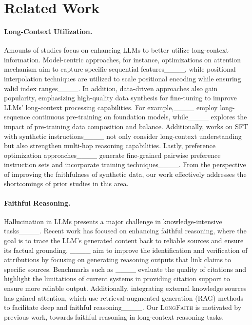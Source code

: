 \section{Related Work}
\label{sec:related}

\paragraph{Long-Context Utilization.} Amounts of studies focus on enhancing LLMs to better utilize long-context information. Model-centric approaches, for instance, optimizations on attention mechanism aim to capture specific sequential features____, while positional interpolation techniques are utilized to scale positional encoding while ensuring valid index ranges____. In addition, data-driven approaches also gain popularity, emphasizing high-quality data synthesis for fine-tuning to improve LLMs' long-context processing capabilities. For example,____ employ long-sequence continuous pre-training on foundation models, while____ explores the impact of pre-training data composition and balance. Additionally, works on SFT with synthetic instructions____ not only consider long-context understanding but also strengthen multi-hop reasoning capabilities. Lastly, preference optimization approaches____ generate fine-grained pairwise preference instruction sets and incorporate training techniques____. From the perspective of improving the faithfulness of synthetic data, our work effectively addresses the shortcomings of prior studies in this area.

\paragraph{Faithful Reasoning.} Hallucination in LLMs presents a major challenge in knowledge-intensive tasks____. Recent work has focused on enhancing faithful reasoning, where the goal is to trace the LLM's generated content back to reliable sources and ensure its factual grounding. ____ aim to improve the identification and verification of attributions by focusing on generating reasoning outputs that link claims to specific sources. Benchmarks such as ____ evaluate the quality of citations and highlight the limitations of current systems in providing citation support to ensure more reliable output. Additionally, integrating external knowledge sources has gained attention, which use retrieval-augmented generation (RAG) methods to facilitate deep and faithful reasoning____. Our \textsc{LongFaith} is motivated by previous work, towards faithful reasoning in long-context reasoning tasks.